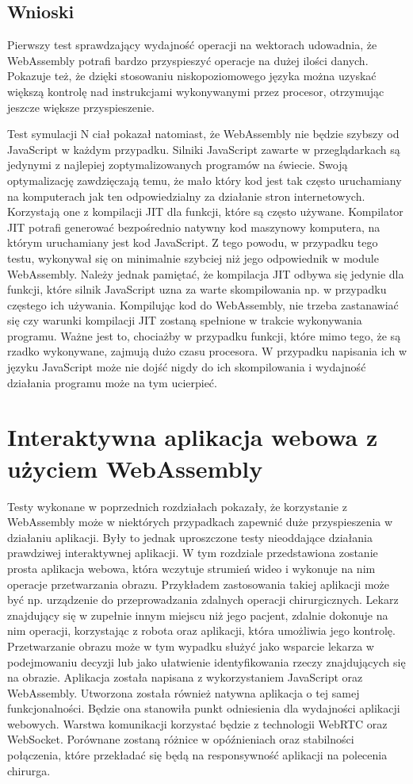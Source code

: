\documentclass[language=polish,type=master]{aghmodern}
\begin{document}
\section{Wnioski}
Pierwszy test sprawdzający wydajność operacji na wektorach udowadnia, że WebAssembly potrafi bardzo przyspieszyć operacje na dużej ilości danych.
Pokazuje też, że dzięki stosowaniu niskopoziomowego języka można uzyskać większą kontrolę nad instrukcjami wykonywanymi przez procesor, otrzymując jeszcze większe przyspieszenie.

Test symulacji N ciał pokazał natomiast, że WebAssembly nie będzie szybszy od JavaScript w każdym przypadku.
Silniki JavaScript zawarte w przeglądarkach są jedynymi z najlepiej zoptymalizowanych programów na świecie.
Swoją optymalizację zawdzięczają temu, że mało który kod jest tak często uruchamiany na komputerach jak ten odpowiedzialny za działanie stron internetowych.
Korzystają one z kompilacji JIT dla funkcji, które są często używane.
Kompilator JIT potrafi generować bezpośrednio natywny kod maszynowy komputera, na którym uruchamiany jest kod JavaScript.
Z tego powodu, w przypadku tego testu, wykonywał się on minimalnie szybciej niż jego odpowiednik w module WebAssembly.
Należy jednak pamiętać, że kompilacja JIT odbywa się jedynie dla funkcji, które silnik JavaScript uzna za warte skompilowania np. w przypadku częstego ich używania.
Kompilując kod do WebAssembly, nie trzeba zastanawiać się czy warunki kompilacji JIT zostaną spełnione w trakcie wykonywania programu.
Ważne jest to, chociażby w przypadku funkcji, które mimo tego, że są rzadko wykonywane, zajmują dużo czasu procesora.
W przypadku napisania ich w języku JavaScript może nie dojść nigdy do ich skompilowania i wydajność działania programu może na tym ucierpieć.

\chapter{Interaktywna aplikacja webowa z użyciem WebAssembly}
Testy wykonane w poprzednich rozdziałach pokazały, że korzystanie z WebAssembly może w niektórych przypadkach zapewnić duże przyspieszenia w działaniu aplikacji.
Były to jednak uproszczone testy nieoddające działania prawdziwej interaktywnej aplikacji.
W tym rozdziale przedstawiona zostanie prosta aplikacja webowa, która wczytuje strumień wideo i wykonuje na nim operacje przetwarzania obrazu.
Przykładem zastosowania takiej aplikacji może być np. urządzenie do przeprowadzania zdalnych operacji chirurgicznych.
Lekarz znajdujący się w zupełnie innym miejscu niż jego pacjent, zdalnie dokonuje na nim operacji, korzystając z robota oraz aplikacji, która umożliwia jego kontrolę.
Przetwarzanie obrazu może w tym wypadku służyć jako wsparcie lekarza w podejmowaniu decyzji lub jako ułatwienie identyfikowania rzeczy znajdujących się na obrazie.
Aplikacja została napisana z wykorzystaniem JavaScript oraz WebAssembly.
Utworzona została również natywna aplikacja o tej samej funkcjonalności.
Będzie ona stanowiła punkt odniesienia dla wydajności aplikacji webowych.
Warstwa komunikacji korzystać będzie z technologii WebRTC oraz WebSocket.
Porównane zostaną różnice w opóźnieniach oraz stabilności połączenia, które przekładać się będą na responsywność aplikacji na polecenia chirurga.
\end{document}
